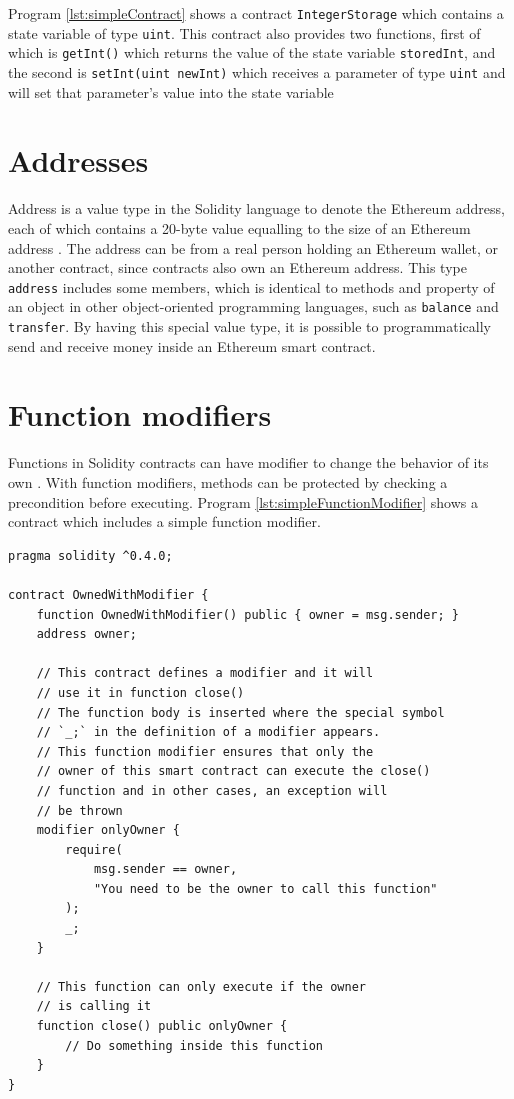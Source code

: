 \documentclass[twoside,numperchapter]{tutthesis} %
\begin{document}
Program \ref{lst:simpleContract} shows a contract \texttt{IntegerStorage} which contains a state variable of type \texttt{uint}. This contract also provides two functions, first of which is \texttt{getInt()} which returns the value of the state variable \texttt{storedInt}, and the second is \texttt{setInt(uint newInt)} which receives a parameter of type \texttt{uint} and will set that parameter's value into the state variable

\section{Addresses}

Address is a value type in the Solidity language to denote the Ethereum address, each of which contains a 20-byte value equalling to the size of an Ethereum address \citep{SolidityDocumentation}. The address can be from a real person holding an Ethereum wallet, or another contract, since contracts also own an Ethereum address. This type \texttt{address} includes some members, which is identical to methods and property of an object in other object-oriented programming languages, such as \texttt{balance} and \texttt{transfer}. By having this special value type, it is possible to programmatically send and receive money inside an Ethereum smart contract.

\section{Function modifiers}
\label{section:functionModifiers}

Functions in Solidity contracts can have modifier to change the behavior of its own \citep{SolidityDocumentation}. With function modifiers, methods can be protected by checking a precondition before executing. Program \ref{lst:simpleFunctionModifier} shows a contract which includes a simple function modifier.

\begin{lstlisting}[float,caption={Simple function modifier in a contract \citep{SolidityDocumentation}.},label={lst:simpleFunctionModifier},language=Solidity,float=h,floatplacement=h]
pragma solidity ^0.4.0;

contract OwnedWithModifier {
    function OwnedWithModifier() public { owner = msg.sender; }
    address owner;

    // This contract defines a modifier and it will
    // use it in function close()
    // The function body is inserted where the special symbol
    // `_;` in the definition of a modifier appears.
    // This function modifier ensures that only the
    // owner of this smart contract can execute the close()
    // function and in other cases, an exception will
    // be thrown
    modifier onlyOwner {
        require(
            msg.sender == owner,
            "You need to be the owner to call this function"
        );
        _;
    }
    
    // This function can only execute if the owner
    // is calling it
    function close() public onlyOwner {
        // Do something inside this function
    }
}
\end{lstlisting}
\end{document}

